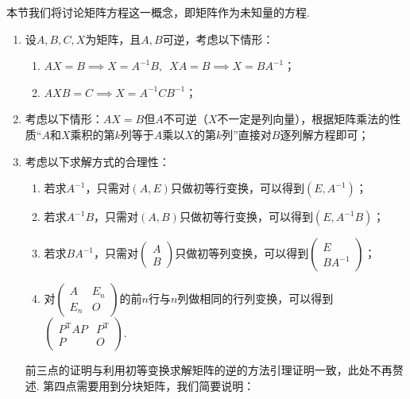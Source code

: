 本节我们将讨论矩阵方程这一概念，即矩阵作为未知量的方程.
\begin{enumerate}
    \item 设$A,B,C,X$为矩阵，且$A,B$可逆，考虑以下情形：
          \begin{enumerate}
              \item $AX=B \implies X=A^{-1}B, \enspace XA=B \implies X=BA^{-1}$；

              \item $AXB=C \implies X=A^{-1}CB^{-1}$；
          \end{enumerate}

    \item 考虑以下情形：$AX=B$但$A$不可逆（$X$不一定是列向量），根据矩阵乘法的性质``$A$和$X$乘积的第$k$列等于$A$乘以$X$的第$k$列''直接对$B$逐列解方程即可；

    \item 考虑以下求解方式的合理性：
          \begin{enumerate}
              \item 若求$A^{-1}$，只需对$(A,E)$只做初等行变换，可以得到$(E,A^{-1})$；

              \item 若求$A^{-1}B$，只需对$(A,B)$只做初等行变换，可以得到$(E,A^{-1}B)$；

              \item 若求$BA^{-1}$，只需对$\begin{pmatrix}
                            A \\ B
                        \end{pmatrix}$只做初等列变换，可以得到$\begin{pmatrix}
                            E \\ BA^{-1}
                        \end{pmatrix}$；

              \item 对$\begin{pmatrix}
                            A & E_n \\ E_n & O
                        \end{pmatrix}$的前$n$行与$n$列做相同的行列变换，可以得到$\begin{pmatrix}
                            P^\mathrm{T}AP & P^\mathrm{T} \\ P & O
                        \end{pmatrix}$.
          \end{enumerate}
          前三点的证明与利用初等变换求解矩阵的逆的方法引理证明一致，此处不再赘述. 第四点需要用到分块矩阵，我们简要说明：


\end{enumerate}
